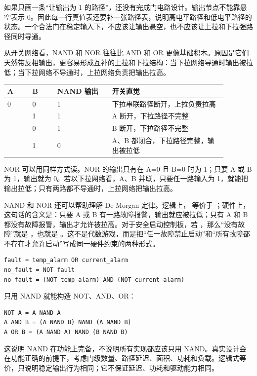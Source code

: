 如果只画一条“让输出为 1 的路径”，还没有完成门电路设计。输出节点不能靠悬空表示 0。因此每一行真值表还要补一张路径表，说明高电平路径和低电平路径的状态。一个合法门在稳定输入下，不应该让输出悬空，也不应该让上拉和下拉强路径同时导通。

从开关网络看，NAND 和 NOR 往往比 AND 和 OR 更像基础积木。原因是它们天然带反相输出，更容易形成互补的上拉和下拉结构：当下拉网络导通时输出被拉低；当下拉网络不导通时，上拉网络负责把输出拉高。

\begin{longtable}{L{0.1\linewidth}L{0.1\linewidth}L{0.22\linewidth}L{0.46\linewidth}}
\toprule
A & B & NAND 输出 & 开关直觉 \\
 & 0 & 1 & 下拉串联路径断开，上拉负责拉高 \\ & 1 & 1 & A 断开，下拉路径不完整 \\ & 0 & 1 & B 断开，下拉路径不完整 \\ & 1 & 0 & A、B 都闭合，下拉路径完整，输出被拉低 \\
\bottomrule
\end{longtable}

NOR 可以用同样方式读。NOR 的输出只有在 A=0 且 B=0 时为 1；只要 A 或 B 为 1，输出就为 0。若以下拉网络看，A、B 并联，只要任一路输入为 1，就能把输出拉低；只有两路都不导通时，上拉网络把输出拉高。

NAND 和 NOR 还可以帮助理解 De Morgan 定律。逻辑上， 等价于 ；硬件上，这句话的含义是：只要 A 或 B 有一路故障报警，输出就应被拉低；只有 A 和 B 都没有故障报警，输出才允许被拉高。对于安全启动控制板，若 ，那么“没有故障”就是 ，也就是 。这不是代数游戏，而是把“任一故障禁止启动”和“所有故障都不存在才允许启动”写成同一硬件约束的两种形式。

\begin{lstlisting}
fault = temp_alarm OR current_alarm
no_fault = NOT fault
no_fault = (NOT temp_alarm) AND (NOT current_alarm)
\end{lstlisting}

只用 NAND 就能构造 NOT、AND、OR：

\begin{lstlisting}
NOT A = A NAND A
A AND B = (A NAND B) NAND (A NAND B)
A OR B = (A NAND A) NAND (B NAND B)
\end{lstlisting}

这说明 NAND 在功能上完备，不说明所有实现都应该只用 NAND。真实设计会在功能正确的前提下，考虑门级数量、路径延迟、面积、功耗和负载。逻辑式等价，只说明稳定输出行为相同；它不保证延迟、功耗和驱动能力相同。

